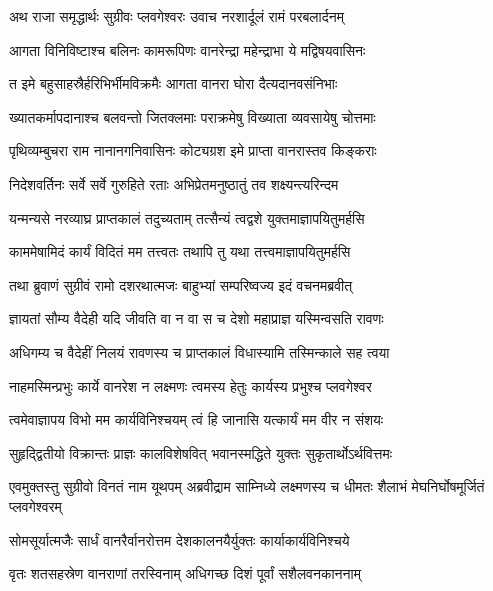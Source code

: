 
\twolineshloka
{अथ राजा समृद्धार्थः सुग्रीवः प्लवगेश्वरः}
{उवाच नरशार्दूलं रामं परबलार्दनम्} %

\twolineshloka
{आगता विनिविष्टाश्च बलिनः कामरूपिणः}
{वानरेन्द्रा महेन्द्राभा ये मद्विषयवासिनः} %

\twolineshloka
{त इमे बहुसाहस्रैर्हरिभिर्भीमविक्रमैः}
{आगता वानरा घोरा दैत्यदानवसंनिभाः} %

\twolineshloka
{ख्यातकर्मापदानाश्च बलवन्तो जितक्लमाः}
{पराक्रमेषु विख्याता व्यवसायेषु चोत्तमाः} %

\twolineshloka
{पृथिव्यम्बुचरा राम नानानगनिवासिनः}
{कोट्यग्रश इमे प्राप्ता वानरास्तव किङ्कराः} %

\twolineshloka
{निदेशवर्तिनः सर्वे सर्वे गुरुहिते रताः}
{अभिप्रेतमनुष्ठातुं तव शक्ष्यन्त्यरिन्दम} %

\twolineshloka
{यन्मन्यसे नरव्याघ्र प्राप्तकालं तदुच्यताम्}
{तत्सैन्यं त्वद्वशे युक्तमाज्ञापयितुमर्हसि} %

\twolineshloka
{काममेषामिदं कार्यं विदितं मम तत्त्वतः}
{तथापि तु यथा तत्त्वमाज्ञापयितुमर्हसि} %

\twolineshloka
{तथा ब्रुवाणं सुग्रीवं रामो दशरथात्मजः}
{बाहुभ्यां सम्परिष्वज्य इदं वचनमब्रवीत्} %

\twolineshloka
{ज्ञायतां सौम्य वैदेही यदि जीवति वा न वा}
{स च देशो महाप्राज्ञ यस्मिन्वसति रावणः} %

\twolineshloka
{अधिगम्य च वैदेहीं निलयं रावणस्य च}
{प्राप्तकालं विधास्यामि तस्मिन्काले सह त्वया} %

\twolineshloka
{नाहमस्मिन्प्रभुः कार्ये वानरेश न लक्ष्मणः}
{त्वमस्य हेतुः कार्यस्य प्रभुश्च प्लवगेश्वर} %

\twolineshloka
{त्वमेवाज्ञापय विभो मम कार्यविनिश्चयम्}
{त्वं हि जानासि यत्कार्यं मम वीर न संशयः} %

\twolineshloka
{सुहृद्द्वितीयो विक्रान्तः प्राज्ञः कालविशेषवित्}
{भवानस्मद्धिते युक्तः सुकृतार्थोऽर्थवित्तमः} %

\threelineshloka
{एवमुक्तस्तु सुग्रीवो विनतं नाम यूथपम्}
{अब्रवीद्राम साम्निध्ये लक्ष्मणस्य च धीमतः}
{शैलाभं मेघनिर्घोषमूर्जितं प्लवगेश्वरम्} %

\twolineshloka
{सोमसूर्यात्मजैः सार्धं वानरैर्वानरोत्तम}
{देशकालनयैर्युक्तः कार्याकार्यविनिश्चये} %

\twolineshloka
{वृतः शतसहस्रेण वानराणां तरस्विनाम्}
{अधिगच्छ दिशं पूर्वां सशैलवनकाननाम्} %

